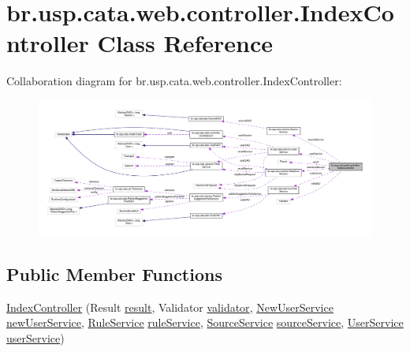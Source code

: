 \hypertarget{classbr_1_1usp_1_1cata_1_1web_1_1controller_1_1_index_controller}{\section{br.\+usp.\+cata.\+web.\+controller.\+Index\+Controller Class Reference}
\label{classbr_1_1usp_1_1cata_1_1web_1_1controller_1_1_index_controller}
}


Collaboration diagram for br.\+usp.\+cata.\+web.\+controller.\+Index\+Controller\+:\nopagebreak
\begin{figure}[H]
\begin{center}
\leavevmode
\includegraphics[width=350pt]{classbr_1_1usp_1_1cata_1_1web_1_1controller_1_1_index_controller__coll__graph}
\end{center}
\end{figure}
\subsection*{Public Member Functions}
\begin{DoxyCompactItemize}
\item 
\hyperlink{classbr_1_1usp_1_1cata_1_1web_1_1controller_1_1_index_controller_a3e2bcb07090321d80842b71baea00192}{Index\+Controller} (Result \hyperlink{classbr_1_1usp_1_1cata_1_1web_1_1controller_1_1_index_controller_ace414d68bfba9031fb373f7b4baa0fd2}{result}, Validator \hyperlink{classbr_1_1usp_1_1cata_1_1web_1_1controller_1_1_index_controller_aeff3144091a7190b11bce384268d3dff}{validator}, \hyperlink{classbr_1_1usp_1_1cata_1_1service_1_1_new_user_service}{New\+User\+Service} \hyperlink{classbr_1_1usp_1_1cata_1_1web_1_1controller_1_1_index_controller_a89da9591484e01e980859f311d6f2cb5}{new\+User\+Service}, \hyperlink{classbr_1_1usp_1_1cata_1_1service_1_1_rule_service}{Rule\+Service} \hyperlink{classbr_1_1usp_1_1cata_1_1web_1_1controller_1_1_index_controller_a4f6fce52bf3206bc01fea51436892c66}{rule\+Service}, \hyperlink{classbr_1_1usp_1_1cata_1_1service_1_1_source_service}{Source\+Service} \hyperlink{classbr_1_1usp_1_1cata_1_1web_1_1controller_1_1_index_controller_aa8494d0f32eb44ed68bb0628b8295e14}{source\+Service}, \hyperlink{classbr_1_1usp_1_1cata_1_1service_1_1_user_service}{User\+Service} \hyperlink{classbr_1_1usp_1_1cata_1_1web_1_1controller_1_1_index_controller_aae8b09d6f60a8edd3995685b8f1cd86c}{user\+Service})
\end{DoxyCompactItemize}
